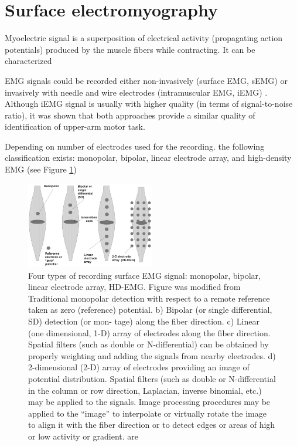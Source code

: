 \section{Surface electromyography}

Myoelectric signal is a superposition of electrical activity (propagating action potentials) produced by the muscle fibers while contracting. It can be characterized
\citep{Farina2014}

EMG signals could be recorded either non-invasively (surface EMG, sEMG) or invasively with needle and wire electrodes (intramuscular EMG, iEMG) \citep{Marateb1999}. Although iEMG signal is usually with higher quality (in terms of signal-to-noise ratio), it was shown that both approaches provide a similar quality of identification of upper-arm motor task\citep{Hargrove2007}.

Depending on number of electrodes used for the recording. the following classification exists: monopolar, bipolar, linear electrode array, and high-density EMG (see Figure \ref{fig:electrode_types})

\begin{figure}[ht]
\centering
\includegraphics[width=0.5\textwidth]{Images/electrode_types.png}
\caption{Four types of recording surface EMG signal: monopolar, bipolar, linear electrode array, HD-EMG. Figure was modified from \citep{Merletti2010}
Traditional monopolar detection with respect to a remote reference taken as zero (reference) potential. b) Bipolar (or single differential, SD) detection (or mon- tage) along the fiber direction. c) Linear (one dimensional, 1-D) array of electrodes along the fiber direction. Spatial filters (such as double or N-differential) can be obtained by properly weighting and adding the signals from nearby electrodes. d) 2-dimensional (2-D) array of electrodes providing an image of potential distribution. Spatial filters (such as double or N-differential in the column or row direction, Laplacian, inverse binomial, etc.) may be applied to the signals. Image processing procedures may be applied to the “image” to interpolate or virtually rotate the image to align it with the fiber direction or to detect edges or areas of high or low activity or gradient.
are}
\label{fig:electrode_types}
\end{figure}


